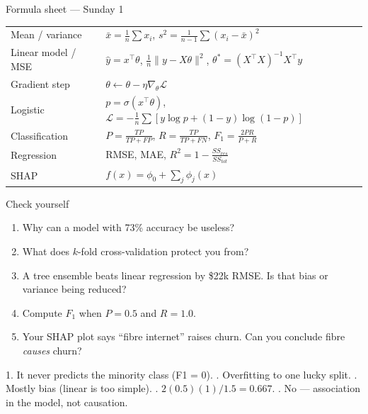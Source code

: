 \documentclass[aspectratio=169,11pt]{beamer}
\begin{document}
\begin{frame}{Formula sheet --- Sunday 1}
\renewcommand{\arraystretch}{1.35}
\begin{tabularx}{\linewidth}{l X}
\toprule
Mean / variance & $\bar x=\frac1n\sum x_i$, \; $s^2=\frac1{n-1}\sum(x_i-\bar x)^2$\\
Linear model / MSE & $\hat y=x^\top\theta$, \; $\frac1n\lVert y-X\theta\rVert^2$, \; $\theta^\ast=(X^\top X)^{-1}X^\top y$\\
Gradient step & $\theta\leftarrow\theta-\eta\nabla_\theta\mathcal{L}$\\
Logistic & $p=\sigma(x^\top\theta)$, \; $\mathcal{L}=-\frac1n\sum[y\log p+(1-y)\log(1-p)]$\\
Classification & $P=\frac{TP}{TP+FP}$, \; $R=\frac{TP}{TP+FN}$, \; $F_1=\frac{2PR}{P+R}$\\
Regression & RMSE, MAE, \; $R^2=1-\frac{SS_{res}}{SS_{tot}}$\\
SHAP & $f(x)=\phi_0+\sum_j\phi_j(x)$\\
\bottomrule
\end{tabularx}
\end{frame}

\begin{frame}{Check yourself}
\begin{enumerate}
\item Why can a model with 73\% accuracy be useless?
\item What does $k$-fold cross-validation protect you from?
\item A tree ensemble beats linear regression by \$22k RMSE. Is that bias or variance being reduced?
\item Compute $F_1$ when $P=0.5$ and $R=1.0$.
\item Your SHAP plot says ``fibre internet'' raises churn. Can you conclude fibre \emph{causes} churn?
\end{enumerate}
\vspace{4pt}
\begin{bex}[Answers]
1. It never predicts the minority class (F1 = 0). . Overfitting to one lucky split. . Mostly bias (linear is too simple). . $2(0.5)(1)/1.5=0.667$. . No --- association in the model, not causation.
\end{bex}
\end{frame}
\end{document}
